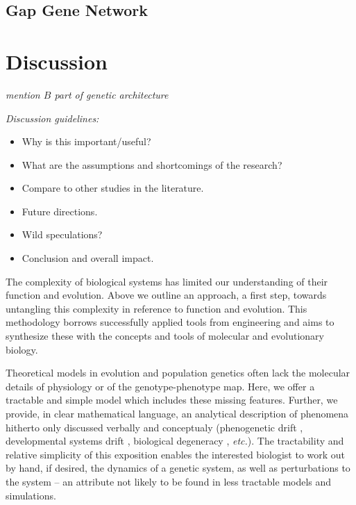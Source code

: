 \documentclass{article}
\newcommand{\plr}[1]{{\color{blue}\it #1}}
\newcommand{\jss}[1]{{\color{olive}\it #1}}
\newcommand{\1}{\mathbbm{1}}
\begin{document}
    \subsection*{Gap Gene Network}

    \section*{Discussion}
      \plr{mention $B$ part of genetic architecture}

      \jss{Discussion guidelines:
        \begin{itemize}
        \item Why is this important/useful?
        \item What are the assumptions and shortcomings of the research?
        \item Compare to other studies in the literature. 
        \item Future directions. 
        \item Wild speculations?
        \item Conclusion and overall impact. 
      \end{itemize}}

  The complexity of biological systems has limited our understanding of their function and evolution. Above we outline an approach, a first step, towards untangling this complexity in reference to function and evolution. This methodology borrows successfully applied tools from engineering and aims to synthesize these with the concepts and tools of molecular and evolutionary biology. 
  
  Theoretical models in evolution and population genetics often lack the molecular details of physiology or of the genotype-phenotype map. Here, we offer a tractable and simple model which includes these missing features. Further, we provide, in clear mathematical language, an analytical description of phenomena hitherto only discussed verbally and conceptualy (phenogenetic drift \citep{weiss2000phenogenetic}, developmental systems drift \citep{true2001developmental}, biological degeneracy \citep{edelman2001degeneracy}, \emph{etc.}). The tractability and relative simplicity of this exposition enables the interested biologist to work out by hand, if desired, the dynamics of a genetic system, as well as perturbations to the system -- an attribute not likely to be found in less tractable models and simulations.
\end{document}

